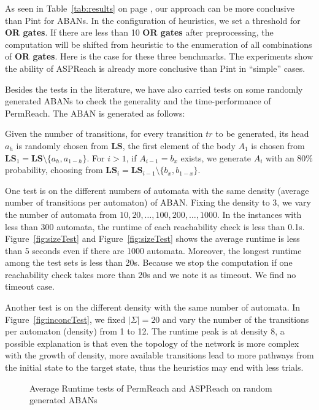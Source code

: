 As seen in Table~\ref{tab:results} on page \pageref{tab:results}, our approach can be more conclusive than Pint for ABANs.
In the configuration of heuristics, we set a threshold for \textbf{OR gates}.
If there are less than 10 \textbf{OR gates} after preprocessing, the computation will be shifted from heuristic to the enumeration of all combinations of \textbf{OR gates}.
Here is the case for these three benchmarks. The experiments show the ability of ASPReach is already more conclusive than Pint in ``simple'' cases.

Besides the tests in the literature, we have also carried tests on some randomly generated ABANs to check the generality and the time-performance of PermReach. 
The ABAN is generated as follows:

Given the number of transitions, for every transition $tr$ to be generated, its head $a_h$ is randomly chosen from $\mathbf{LS}$, the first element of the body $A_1$ is chosen from $\mathbf{LS}_1=\mathbf{LS}\setminus \{a_h,a_{1-h}\}$.
For $i>1$, if $A_{i-1}=b_x$ exists, we generate $A_i$ with an 80\% probability, choosing from $\mathbf{LS}_i=\mathbf{LS}_{i-1}\setminus \{b_x,b_{1-x}\}$. 
 
One test is on the different numbers of automata with the same density (average number of transitions per automaton) of ABAN. Fixing the density to 3, we vary the number of automata from $10,20,\ldots,100,200,\ldots,1000$.
In the instances with less than 300 automata, the runtime of each reachability check is less than 0.1s.
Figure~\ref{fig:sizeTest} and Figure~\ref{fig:sizeTest} shows the average runtime is less than 5 seconds even if there are 1000 automata. 
Moreover, the longest runtime among the test sets is less than 20s. 
Because we stop the computation if one reachability check takes more than 20s and we note it as timeout.
We find no timeout case.

Another test is on the different density with the same number of automata. 
In Figure~\ref{fig:inconcTest}, we fixed $|\Sigma|=20$ and vary the number of the transitions per automaton (density) from 1 to 12.
The runtime peak is at density 8, a possible explanation is that even the topology of the network is more complex with the growth of density, more available transitions lead to more pathways from the initial state to the target state, thus the heuristics may end with less trials.

\begin{figure}[ht]
    \caption[Runtime tests of reachability analyzers]{Average Runtime tests of PermReach and ASPReach on random generated ABANs}
\end{figure}

